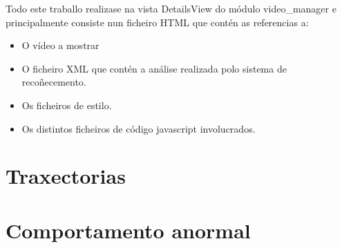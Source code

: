 	Todo este traballo realizase na vista DetailsView do módulo video\_manager e principalmente 
	consiste nun ficheiro HTML que contén as referencias a:
	\begin{itemize}
     \item O vídeo a mostrar
     \item O ficheiro XML que contén a análise realizada polo sistema de recoñecemento.
     \item Os ficheiros de estilo.
     \item Os distintos ficheiros de código javascript involucrados.
    \end{itemize}
    
    
\section{Traxectorias}

\section{Comportamento anormal}
